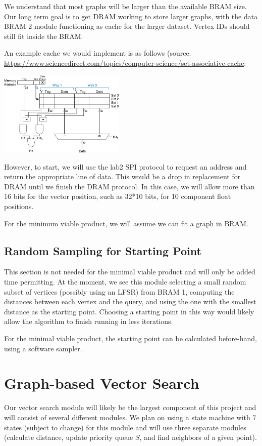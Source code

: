 \documentclass{article}
\begin{document}
We understand that most graphs will be larger than the available BRAM size. Our long term goal is to get DRAM working to store larger graphs, with the data BRAM 2 module functioning as cache for the larger dataset. Vertex IDs should still fit inside the BRAM. 

An example cache we would implement is as follows (source: \href{https://www.sciencedirect.com/topics/computer-science/set-associative-cache}{https://www.sciencedirect.com/topics/computer-science/set-associative-cache}:

\includegraphics[width=6cm]{cache.jpg}

However, to start, we will use the lab2 SPI protocol to request an address and return the appropriate line of data. This would be a drop in replacement for DRAM until we finish the DRAM protocol. In this case, we will allow more than 16 bits for the vector position, such as 32*10 bits, for 10 component float positions.

For the minimum viable product, we will assume we can fit a graph in BRAM. 

\subsection{Random Sampling for Starting Point}

This section is not needed for the minimal viable product and will only be added time permitting. At the moment, we see this module selecting a small random subset of vertices (possibly using an LFSR) from BRAM 1, computing the distances between each vertex and the query, and using the one with the smallest distance as the starting point. Choosing a starting point in this way would likely allow the algorithm to finish running in less iterations.

For the minimal viable product, the starting point can be calculated before-hand, using a software sampler.

\section{Graph-based Vector Search}
Our vector search module will likely be the largest component of this project and will consist of several different modules. We plan on using a state machine with 7 states (subject to change) for this module and will use three separate modules (calculate distance, update priority queue $S$, and find neighbors of a given point). 
\end{document}

